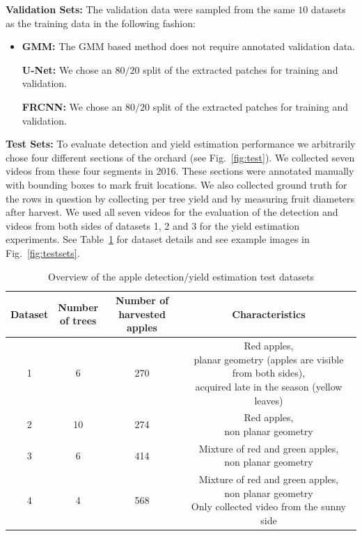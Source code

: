 \textbf{Validation Sets:}
The validation data were sampled from the same $10$ datasets as the training data in the following fashion:
\begin{itemize}
    \item[] \textbf{GMM:} The GMM based method does not require annotated validation data.
    
    \textbf{U-Net:} We chose an $80/20$ split of the extracted patches for training and validation.
    
    \textbf{FRCNN:} We chose an $80/20$ split of the extracted patches for training and validation.
\end{itemize}

\textbf{Test Sets:}
To evaluate detection and yield estimation performance we arbitrarily chose four different sections of the orchard (see Fig.~\ref{fig:test}). We collected seven videos from these four segments in 2016. These sections were annotated manually with bounding boxes to mark fruit locations. We also collected ground truth for the rows in question by collecting per tree yield and by measuring fruit diameters after harvest. We used all seven videos for the evaluation of the detection and videos from both sides of datasets 1, 2 and 3 for the yield estimation experiments. See Table~\ref{tab:data} for dataset details and see example images in Fig.~\ref{fig:testsets}.

\begin{table}[ht!]
    \begin{center}
        \caption{Overview of the apple detection/yield estimation test datasets}
        \label{tab:data}
        \begin{tabular}{|c|c|c|c|}
            \hline
            \textbf{Dataset} & \specialcell{\textbf{Number} \\ \textbf{of trees}} & \specialcell{\textbf{Number of} \\ \textbf{harvested apples}}  & \textbf{Characteristics} \\
            \hline
            1 & 6 & 270 & \specialcell{Red apples, \\ planar geometry (apples are visible from both sides), \\ acquired late in the season (yellow leaves)}\\
            \hline
            2 & 10 & 274 & \specialcell{Red apples, \\ non planar geometry} \\
            \hline
            3 & 6 & 414 & \specialcell{Mixture of red and green apples, \\ non planar geometry} \\
            \hline
            4 & 4 & 568 & \specialcell{Mixture of red and green apples, \\ non planar geometry \\ Only collected video from the sunny side} \\
            \hline
        \end{tabular}
    \end{center}
\end{table}

